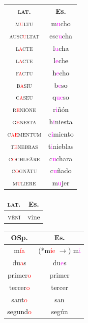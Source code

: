 \documentclass{report}[12pt]
\begin{document}
\begin{tabular}{c c}
  \textsc{lat.} & Es. \\
  \hline
  \textsc{m\textcolor{red}{u}ltu} & m\textcolor{magenta}{u}cho \\
  \textsc{ausc\textcolor{red}{u}ltat} & esc\textcolor{magenta}{u}cha \\
  \textsc{l\textcolor{red}{a}cte} & l\textcolor{magenta}{u}cha \\
  \textsc{l\textcolor{red}{a}cte} & l\textcolor{magenta}{e}che \\
  \textsc{f\textcolor{red}{a}ctu} & h\textcolor{magenta}{e}cho \\
  \textsc{b\textcolor{red}{a}siu} & b\textcolor{magenta}{e}so \\
  \textsc{c\textcolor{red}{a}seu} & q\textcolor{magenta}{ue}so \\
  \textsc{r\textcolor{red}{e}ni\={o}ne} & r\textcolor{magenta}{i}ñón \\
  \textsc{g\textcolor{red}{e}nesta} & h\textcolor{magenta}{i}niesta \\
  \textsc{c\textcolor{red}{ae}mentum} & c\textcolor{magenta}{i}miento \\
  \textsc{t\textcolor{red}{e}nebras} & t\textcolor{magenta}{i}nieblas \\
  \textsc{c\textcolor{red}{o}chle\={a}re} & c\textcolor{magenta}{u}chara \\
  \textsc{c\textcolor{red}{o}gn\={a}tu} & c\textcolor{magenta}{u}ñado \\
  \textsc{m\textcolor{red}{u}liere} & m\textcolor{magenta}ujer \\
\end{tabular}

\begin{tcolorbox}[title=Reduction of Final Vowels]

\end{tcolorbox}

\begin{tabular}{c c}
  \textsc{lat.} & Es. \\
  \hline
  \textsc{v\={e}n\={i}} & vine \\  
\end{tabular}

\begin{tabular}{c c}
  OSp. & Es. \\
  \hline
  m\textcolor{red}{ía} & (*m\textcolor{red}{íe} $\rightarrow$) m\textcolor{magenta}{i} \\
  du\textcolor{red}{a}s & du\textcolor{magenta}{e}s \\
  primer\textcolor{red}{o} & primer \\
  tercer\textcolor{red}{o} & tercer \\
  sant\textcolor{red}{o} & san \\
  segund\textcolor{red}{o} & según \\
\end{tabular}
\end{document}
